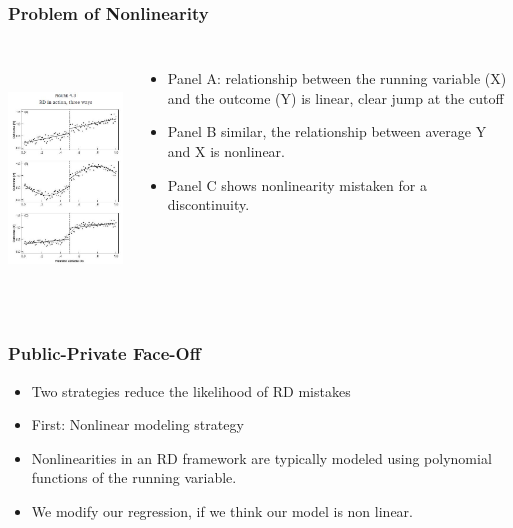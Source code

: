 \documentclass{beamer}
\begin{document}
\begin{frame}
\frametitle{Problem of Nonlinearity}
\begin{columns}
\includegraphics[width=6cm,height=6.5cm,keepaspectratio]{Figure 4.3} 

\begin{itemize}
	\item Panel A: relationship between the running variable (X) and the outcome (Y) is linear, clear jump at the cutoff 
	\item Panel B similar, the relationship between average Y and X is nonlinear.
	\item Panel C shows nonlinearity mistaken for a discontinuity.
\end{itemize}
\end{columns}	
\end{frame}
\begin{frame}
\frametitle{Public-Private Face-Off}

\begin{itemize}
	\item Two strategies reduce the likelihood of RD mistakes
	\item First: Nonlinear modeling strategy
	\item Nonlinearities in an RD framework are typically modeled using polynomial functions of the running variable.
	\item We modify our regression, if we think our model is non linear.
\end{itemize}

\end{frame}
\end{document}
